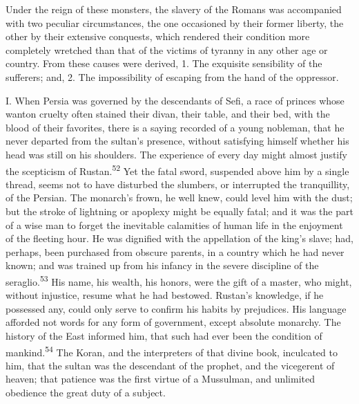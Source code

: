 
Under the reign of these monsters, the slavery of the Romans was
accompanied with two peculiar circumstances, the one occasioned
by their former liberty, the other by their extensive conquests,
which rendered their condition more completely wretched than that
of the victims of tyranny in any other age or country. From these
causes were derived, 1. The exquisite sensibility of the
sufferers; and, 2. The impossibility of escaping from the hand of
the oppressor.

I. When Persia was governed by the descendants of Sefi, a race of
princes whose wanton cruelty often stained their divan, their
table, and their bed, with the blood of their favorites, there is
a saying recorded of a young nobleman, that he never departed
from the sultan’s presence, without satisfying himself whether
his head was still on his shoulders. The experience of every day
might almost justify the scepticism of Rustan.\textsuperscript{52} Yet the fatal
sword, suspended above him by a single thread, seems not to have
disturbed the slumbers, or interrupted the tranquillity, of the
Persian. The monarch’s frown, he well knew, could level him with
the dust; but the stroke of lightning or apoplexy might be
equally fatal; and it was the part of a wise man to forget the
inevitable calamities of human life in the enjoyment of the
fleeting hour. He was dignified with the appellation of the
king’s slave; had, perhaps, been purchased from obscure parents,
in a country which he had never known; and was trained up from
his infancy in the severe discipline of the seraglio.\textsuperscript{53} His
name, his wealth, his honors, were the gift of a master, who
might, without injustice, resume what he had bestowed. Rustan’s
knowledge, if he possessed any, could only serve to confirm his
habits by prejudices. His language afforded not words for any
form of government, except absolute monarchy. The history of the
East informed him, that such had ever been the condition of
mankind.\textsuperscript{54} The Koran, and the interpreters of that divine book,
inculcated to him, that the sultan was the descendant of the
prophet, and the vicegerent of heaven; that patience was the
first virtue of a Mussulman, and unlimited obedience the great
duty of a subject.



